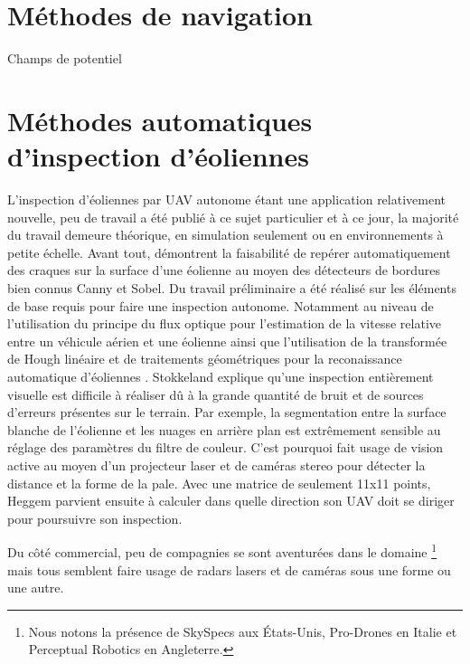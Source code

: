 \section{Méthodes de navigation}\label{subsec:navigation}

Champs de potentiel

\section{Méthodes automatiques d'inspection d'éoliennes}\label{subsec:eolienne}

L'inspection d'éoliennes par UAV autonome étant une application relativement nouvelle, peu de travail a été publié à ce sujet particulier et à ce jour, la majorité du travail demeure théorique, en simulation seulement ou en environnements à petite échelle. Avant tout, \citep{Zhang2014} démontrent la faisabilité de repérer automatiquement des craques sur la surface d'une éolienne au moyen des détecteurs de bordures bien connus Canny et Sobel. Du travail préliminaire a été réalisé sur les éléments de base requis pour faire une inspection autonome. Notamment au niveau de l'utilisation du principe du flux optique pour l'estimation de la vitesse relative entre un véhicule aérien et une éolienne \citep{Hoglund2014} ainsi que l'utilisation de la transformée de Hough linéaire et de traitements géométriques pour la reconaissance automatique d'éoliennes \citep{Stokkeland2015}. Stokkeland explique qu'une inspection entièrement visuelle est difficile à réaliser dû à la grande quantité de bruit et de sources d'erreurs présentes sur le terrain. Par exemple, la segmentation entre la surface blanche de l'éolienne et les nuages en arrière plan est extrêmement sensible au réglage des paramètres du filtre de couleur. C'est pourquoi \citep{Heggem2017} fait usage de vision active au moyen d'un projecteur laser et de caméras stereo pour détecter la distance et la forme de la pale. Avec une matrice de seulement 11x11 points, Heggem parvient ensuite à calculer dans quelle direction son UAV doit se diriger pour poursuivre son inspection.

Du côté commercial, peu de compagnies se sont aventurées dans le domaine \footnote{Nous notons la présence de SkySpecs aux États-Unis, Pro-Drones en Italie et Perceptual Robotics en Angleterre.} mais tous semblent faire usage de radars lasers et de caméras sous une forme ou une autre.
